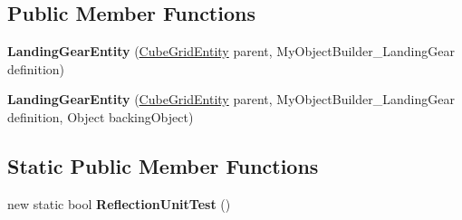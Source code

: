 \subsection*{Public Member Functions}
\begin{DoxyCompactItemize}
\item 
\hypertarget{class_s_e_mod_a_p_i_internal_1_1_a_p_i_1_1_entity_1_1_sector_1_1_sector_object_1_1_cube_grid_1_102e4670a1e074b947ebe3418c499e61c_ad0f05e8369ad2a47416cbe16d7a9de92}{}{\bfseries Landing\+Gear\+Entity} (\hyperlink{class_s_e_mod_a_p_i_internal_1_1_a_p_i_1_1_entity_1_1_sector_1_1_sector_object_1_1_cube_grid_entity}{Cube\+Grid\+Entity} parent, My\+Object\+Builder\+\_\+\+Landing\+Gear definition)\label{class_s_e_mod_a_p_i_internal_1_1_a_p_i_1_1_entity_1_1_sector_1_1_sector_object_1_1_cube_grid_1_102e4670a1e074b947ebe3418c499e61c_ad0f05e8369ad2a47416cbe16d7a9de92}

\item 
\hypertarget{class_s_e_mod_a_p_i_internal_1_1_a_p_i_1_1_entity_1_1_sector_1_1_sector_object_1_1_cube_grid_1_102e4670a1e074b947ebe3418c499e61c_adef16394ba4e5373e12e9222229bc005}{}{\bfseries Landing\+Gear\+Entity} (\hyperlink{class_s_e_mod_a_p_i_internal_1_1_a_p_i_1_1_entity_1_1_sector_1_1_sector_object_1_1_cube_grid_entity}{Cube\+Grid\+Entity} parent, My\+Object\+Builder\+\_\+\+Landing\+Gear definition, Object backing\+Object)\label{class_s_e_mod_a_p_i_internal_1_1_a_p_i_1_1_entity_1_1_sector_1_1_sector_object_1_1_cube_grid_1_102e4670a1e074b947ebe3418c499e61c_adef16394ba4e5373e12e9222229bc005}

\end{DoxyCompactItemize}
\subsection*{Static Public Member Functions}
\begin{DoxyCompactItemize}
\item 
\hypertarget{class_s_e_mod_a_p_i_internal_1_1_a_p_i_1_1_entity_1_1_sector_1_1_sector_object_1_1_cube_grid_1_102e4670a1e074b947ebe3418c499e61c_ad8ee49c060cfa4247e373dcde5bafeef}{}new static bool {\bfseries Reflection\+Unit\+Test} ()\label{class_s_e_mod_a_p_i_internal_1_1_a_p_i_1_1_entity_1_1_sector_1_1_sector_object_1_1_cube_grid_1_102e4670a1e074b947ebe3418c499e61c_ad8ee49c060cfa4247e373dcde5bafeef}

\end{DoxyCompactItemize}

